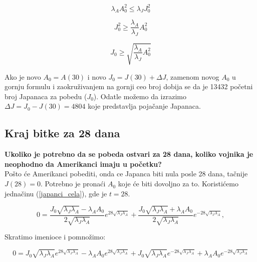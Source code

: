 \documentclass{article}
\newcommand{\laj}{\sqrt{\lambda_J\lambda_A}}
\begin{document}
\[
  \lambda_{A}A_0^2 \leq \lambda_{J}J_0^2
\]

\[
  J_0^2 \geq \frac{\lambda_A}{\lambda_J} A_0^2
\]

\[
  J_0 \geq \sqrt{\frac{\lambda_A}{\lambda_J} A_0^2}
\]

Ako je novo \(A_0 = A(30)\) i novo \(J_0 = J(30) + \Delta J\), zamenom novog \(A_0\) u gornju formulu i zaokruživanjem na gornji ceo broj dobija se da je 13432 početni
broj Japanaca za pobedu (\(J_0\)).
Odatle možemo da izrazimo \(\Delta J = J_0 - J(30) = 4804\) koje predstavlja
pojačanje Japanaca.

\begin{center}
\end{center}

\newpage

\subsection{Kraj bitke za 28 dana}
\textbf{Ukoliko je potrebno da se pobeda ostvari za 28 dana, koliko
vojnika je \\ neophodno da Amerikanci imaju u
početku?} \\

\hspace{5mm}
Pošto će Amerikanci pobediti, onda ce Japanca biti nula posle 28 dana,
tačnije \(J(28) = 0\). Potrebno je pronaći \(A_0\) koje će biti dovoljno
za to. Koristićemo jednačinu (\ref{japanci_cela}), gde je \(t = 28\).

\[
0 = \frac{J_0 \laj - \lambda_A A_0}{2\laj} e^{28 \laj } +
    \frac{J_0 \laj + \lambda_A A_0}{2 \laj } e^{-28 \laj },
\]

Skratimo imenioce i pomnožimo:

\[
  0 = J_0 \laj e^{28 \laj } - \lambda_A A_0 e^{28 \laj} +
  J_0 \laj e^{-28 \laj} + \lambda_A A_0 e^{-28 \laj}
\]
\end{document}
